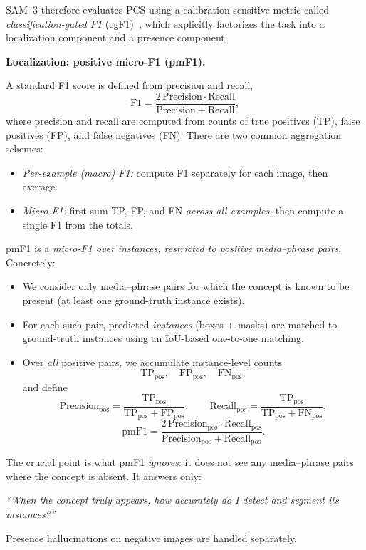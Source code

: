 \begin{enrichment}
\begin{enrichment}
		SAM~3 therefore evaluates PCS using a calibration-sensitive metric called \emph{classification-gated F1} (cgF1)~\cite{carion2025_sam3}, which explicitly factorizes the task into a localization component and a presence component.
		
		\medskip
		\noindent\textbf{Localization: positive micro-F1 (pmF1).}
		
		A standard F1 score is defined from precision and recall,
		\[
		\mathrm{F1} = \frac{2 \,\mathrm{Precision} \cdot \mathrm{Recall}}{\mathrm{Precision} + \mathrm{Recall}},
		\]
		where precision and recall are computed from counts of true positives (TP), false positives (FP), and false negatives (FN). There are two common aggregation schemes:
		\begin{itemize}
			\item \emph{Per-example (macro) F1:} compute F1 separately for each image, then average.
			\item \emph{Micro-F1:} first sum TP, FP, and FN \emph{across all examples}, then compute a single F1 from the totals.
		\end{itemize}
		
		pmF1 is a \emph{micro-F1 over instances, restricted to positive media--phrase pairs}. Concretely:
		\begin{itemize}
			\item We consider only media--phrase pairs for which the concept is known to be present (at least one ground-truth instance exists).
			\item For each such pair, predicted \emph{instances} (boxes + masks) are matched to ground-truth instances using an IoU-based one-to-one matching.
			\item Over \emph{all} positive pairs, we accumulate instance-level counts
			\[
			\mathrm{TP}_\text{pos},\quad \mathrm{FP}_\text{pos},\quad \mathrm{FN}_\text{pos},
			\]
			and define
			\[
			\mathrm{Precision}_\text{pos} =
			\frac{\mathrm{TP}_\text{pos}}{\mathrm{TP}_\text{pos} + \mathrm{FP}_\text{pos}}, 
			\qquad
			\mathrm{Recall}_\text{pos} =
			\frac{\mathrm{TP}_\text{pos}}{\mathrm{TP}_\text{pos} + \mathrm{FN}_\text{pos}},
			\]
			\[
			\mathrm{pmF1} =
			\frac{2 \,\mathrm{Precision}_\text{pos} \cdot \mathrm{Recall}_\text{pos}}
			{\mathrm{Precision}_\text{pos} + \mathrm{Recall}_\text{pos}}.
			\]
		\end{itemize}
		
		The crucial point is what pmF1 \emph{ignores}: it does not see any media--phrase pairs where the concept is absent. It answers only:
		\begin{center}
			\emph{``When the concept truly appears, how accurately do I detect and segment its instances?''}
		\end{center}
		Presence hallucinations on negative images are handled separately.
		

\end{enrichment}
\end{enrichment}
